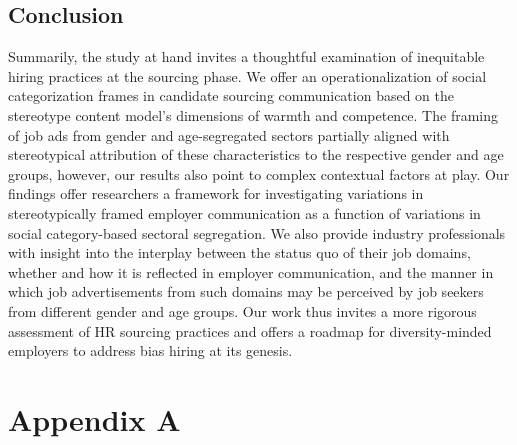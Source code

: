 \documentclass[Royal,sageapa,times]{sagej}
\begin{document}
\subsection{Conclusion\label{conclusion}}
Summarily, the study at hand invites a thoughtful examination of inequitable hiring practices at the sourcing phase. We offer an operationalization of social categorization frames in candidate sourcing communication based on the stereotype content model’s dimensions of warmth and competence. The framing of job ads from gender and age-segregated sectors partially aligned with stereotypical attribution of these characteristics to the respective gender and age groups, however, our results also point to complex contextual factors at play. Our findings offer researchers a framework for investigating variations in stereotypically framed employer communication as a function of variations in social category-based sectoral segregation. We also provide industry professionals with insight into the interplay between the status quo of their job domains, whether and how it is reflected in employer communication, and the manner in which job advertisements from such domains may be perceived by job seekers from different gender and age groups. Our work thus invites a more rigorous assessment of HR sourcing practices and offers a roadmap for diversity-minded employers to address bias hiring at its genesis.

\theendnotes



\clearpage
\newpage
\section{Appendix A\label{appendix_a}}
\end{document}
